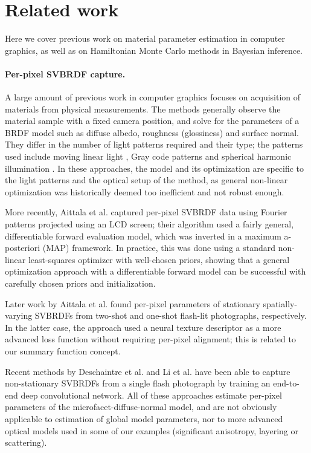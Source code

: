 \section{Related work}

Here we cover previous work on material parameter estimation in computer graphics, as well as on Hamiltonian Monte Carlo methods in Bayesian inference.

\paragraph{Per-pixel SVBRDF capture.} A large amount of previous work in computer graphics focuses on acquisition of materials from physical measurements. The methods generally observe the material sample with a fixed camera position, and solve for the parameters of a BRDF model such as diffuse albedo, roughness (glossiness) and surface normal. They differ in the number of light patterns required and their type; the patterns used include moving linear light \cite{Gardner2003}, Gray code patterns \cite{Francken2009} and spherical harmonic illumination \cite{Ghosh2009}. In these approaches, the model and its optimization are specific to the light patterns and the optical setup of the method, as general non-linear optimization was historically deemed too inefficient and not robust enough.

More recently, Aittala et al.  captured per-pixel SVBRDF data using Fourier patterns projected using an LCD screen; their algorithm used a fairly general, differentiable forward evaluation model, which was inverted in a maximum a-posteriori (MAP) framework. In practice, this was done using a standard non-linear least-squares optimizer with well-chosen priors, showing that a general optimization approach with a differentiable forward model can be successful with carefully chosen priors and initialization.

Later work by Aittala et al.  found per-pixel parameters of stationary spatially-varying SVBRDFs from two-shot and one-shot flash-lit photographs, respectively. In the latter case, the approach used a neural texture descriptor as a more advanced loss function without requiring per-pixel alignment; this is related to our summary function concept.

Recent methods by Deschaintre et al.  and Li et al.  have been able to capture non-stationary SVBRDFs from a single flash photograph by training an end-to-end deep convolutional network. All of these approaches estimate per-pixel parameters of the microfacet-diffuse-normal model, and are not obviously applicable to estimation of global model parameters, nor to more advanced optical models used in some of our examples (significant anisotropy, layering or scattering).

